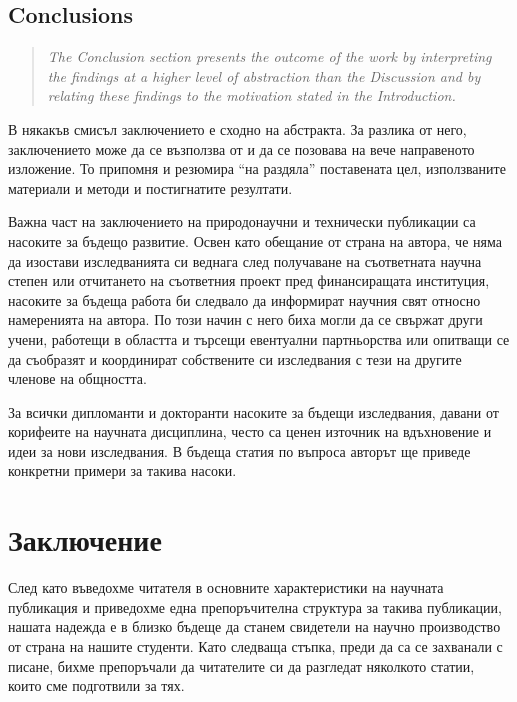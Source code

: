 \documentclass[11pt, oneside]{article}     %
\newenvironment{quotenature}{\begin{quote}\itshape}{\cite{nature}\end{quote}}
\begin{document}
\subsection*{Conclusions}

\begin{quotenature}
  The Conclusion section presents the outcome of the work by
  interpreting the findings at a higher level of abstraction than the
  Discussion and by relating these findings to the motivation stated
  in the Introduction.
\end{quotenature}

В някакъв смисъл заключението е сходно на абстракта. За разлика от него, заключението може да се възползва от и да се позовава на вече направеното изложение. То припомня и резюмира ``на раздяла'' поставената цел, използваните материали и методи и постигнатите резултати.

Важна част на заключението на природонаучни и технически публикации са насоките за бъдещо развитие. Освен като обещание от страна на автора, че няма да изостави изследванията си веднага след получаване на съответната научна степен или отчитането на съответния проект пред финансиращата институция, насоките за бъдеща работа би следвало да информират научния свят относно намеренията на автора. По този начин с него биха могли да се свържат други учени, работещи в областта и търсещи евентуални партньорства или опитващи се да съобразят и координират собствените си изследвания с тези на другите членове на общността. 

За всички дипломанти и докторанти насоките за бъдещи изследвания, давани от корифеите на научната дисциплина, често са ценен източник на вдъхновение и идеи за нови изследвания. В бъдеща статия по въпроса авторът ще приведе конкретни примери за такива насоки.

\section{Заключение}

След като въведохме читателя в основните характеристики на научната публикация и приведохме една препоръчителна структура за такива публикации, нашата надежда е в близко бъдеще да станем свидетели на научно производство от страна на нашите студенти. Като следваща стъпка, преди да са се захванали с писане, бихме препоръчали да читателите си да разгледат няколкото статии, които сме подготвили за тях.
\end{document}
